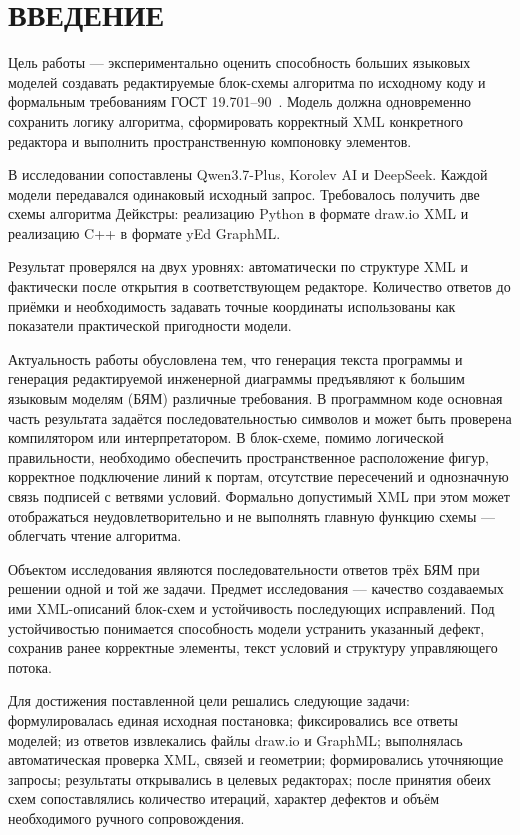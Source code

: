 \documentclass[a4paper,12pt]{extreport}
\begin{document}
\chapter*{ВВЕДЕНИЕ}
\endgroup

Цель работы --- экспериментально оценить способность больших языковых моделей создавать редактируемые блок-схемы алгоритма по исходному коду и формальным требованиям ГОСТ 19.701--90~\cite{gost19701}. Модель должна одновременно сохранить логику алгоритма, сформировать корректный XML конкретного редактора и выполнить пространственную компоновку элементов.

В исследовании сопоставлены Qwen3.7-Plus, Korolev AI и DeepSeek. Каждой модели передавался одинаковый исходный запрос. Требовалось получить две схемы алгоритма Дейкстры: реализацию Python в формате draw.io XML и реализацию C++ в формате yEd GraphML.

Результат проверялся на двух уровнях: автоматически по структуре XML и фактически после открытия в соответствующем редакторе. Количество ответов до приёмки и необходимость задавать точные координаты использованы как показатели практической пригодности модели.

Актуальность работы обусловлена тем, что генерация текста программы и генерация редактируемой инженерной диаграммы предъявляют к большим языковым моделям (БЯМ) различные требования. В программном коде основная часть результата задаётся последовательностью символов и может быть проверена компилятором или интерпретатором. В блок-схеме, помимо логической правильности, необходимо обеспечить пространственное расположение фигур, корректное подключение линий к портам, отсутствие пересечений и однозначную связь подписей с ветвями условий. Формально допустимый XML при этом может отображаться неудовлетворительно и не выполнять главную функцию схемы --- облегчать чтение алгоритма.

Объектом исследования являются последовательности ответов трёх БЯМ при решении одной и той же задачи. Предмет исследования --- качество создаваемых ими XML-описаний блок-схем и устойчивость последующих исправлений. Под устойчивостью понимается способность модели устранить указанный дефект, сохранив ранее корректные элементы, текст условий и структуру управляющего потока.

Для достижения поставленной цели решались следующие задачи: формулировалась единая исходная постановка; фиксировались все ответы моделей; из ответов извлекались файлы draw.io и GraphML; выполнялась автоматическая проверка XML, связей и геометрии; формировались уточняющие запросы; результаты открывались в целевых редакторах; после принятия обеих схем сопоставлялись количество итераций, характер дефектов и объём необходимого ручного сопровождения.
\end{document}
